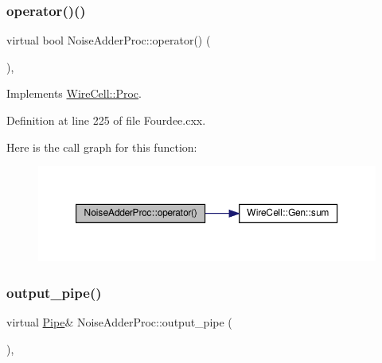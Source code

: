 \mbox{\label{class_noise_adder_proc_ace359f99c495a3cb4f4276c9e2b3ba4d}} 
\subsubsection{\texorpdfstring{operator()()}{operator()()}}
{\footnotesize\ttfamily virtual bool Noise\+Adder\+Proc\+::operator() (\begin{DoxyParamCaption}{ }\end{DoxyParamCaption})\hspace{0.3cm}{\ttfamily [inline]}, {\ttfamily [virtual]}}



Implements \hyperlink{class_wire_cell_1_1_proc_a9c642ed1f6b6741633c6cb1bd063b502}{Wire\+Cell\+::\+Proc}.



Definition at line 225 of file Fourdee.\+cxx.

Here is the call graph for this function\+:
\nopagebreak
\begin{figure}[H]
\begin{center}
\leavevmode
\includegraphics[width=350pt]{class_noise_adder_proc_ace359f99c495a3cb4f4276c9e2b3ba4d_cgraph}
\end{center}
\end{figure}
\mbox{\label{class_noise_adder_proc_aa0b42db936bac1b8686e28e84e96b6ef}} 
\subsubsection{\texorpdfstring{output\+\_\+pipe()}{output\_pipe()}}
{\footnotesize\ttfamily virtual \hyperlink{namespace_wire_cell_afce9bb01c731347c3d4c8ca9d4ed804f}{Pipe}\& Noise\+Adder\+Proc\+::output\+\_\+pipe (\begin{DoxyParamCaption}{ }\end{DoxyParamCaption})\hspace{0.3cm}{\ttfamily [inline]}, {\ttfamily [virtual]}}



